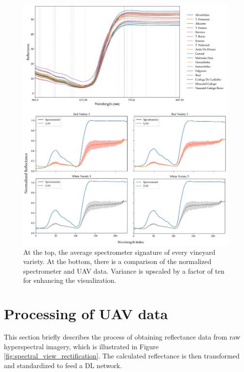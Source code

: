 \begin{figure}[ht]
    \centering
    \includegraphics[width=\linewidth]{figs/vineyard_classification/spectrometer_varieties.png}
	\caption{At the top, the average spectrometer signature of every vineyard variety. At the bottom, there is a comparison of the normalized spectrometer and UAV data. Variance is upscaled by a factor of ten for enhancing the visualization.}
	\label{fig:spectrometer_uav_data}
\end{figure}

\section{Processing of UAV data}
\label{sec:vineyard_hyperspectral_processing}

This section briefly describes the process of obtaining reflectance data from raw hyperspectral imagery, which is illustrated in Figure \ref{fig:spectral_view_rectification}. The calculated reflectance is then transformed and standardized to feed a DL network. 

